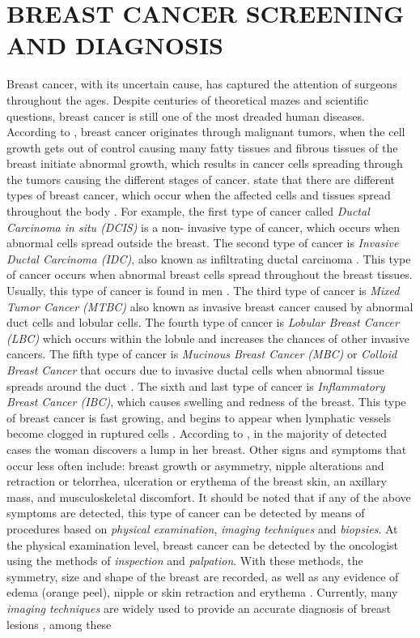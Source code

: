 \section{BREAST CANCER SCREENING AND DIAGNOSIS}
Breast cancer, with its uncertain cause, has captured the attention of surgeons throughout the ages. Despite centuries of theoretical mazes and scientific questions, breast cancer is still one of the most dreaded human diseases\cite{Bland2009}. According to \cite{Fatima2020}, breast cancer originates through malignant tumors, when the cell growth gets out of control causing many fatty tissues and fibrous tissues of the breast initiate abnormal growth, which results in cancer cells spreading through the tumors causing the different stages of cancer. \cite{Fatima2020} state that there are different types of breast cancer, which occur when the affected cells and tissues spread throughout the body \cite{Sun2017}. For example, the first type of cancer called \textit{Ductal Carcinoma in situ (DCIS)} is a non- invasive type of cancer\cite{Hou2020}, which occurs when abnormal cells spread outside the breast. The second type of cancer is \textit{Invasive Ductal Carcinoma (IDC)}, also known as infiltrating ductal carcinoma \cite{Chaudhury2011}. This type of cancer occurs when abnormal breast cells spread throughout the breast tissues. Usually, this type of cancer is found in men \cite{Page1982}. The third type of cancer is \textit{Mixed Tumor Cancer (MTBC)} also known as invasive breast cancer\cite{Tuck1997}  caused by abnormal duct cells and lobular cells\cite{Lee2017}. The fourth type of cancer is \textit{Lobular Breast Cancer (LBC)}\cite{Masciari2007}  which occurs within the lobule and increases the chances of other invasive cancers. The fifth type of cancer is \textit{Mucinous Breast Cancer (MBC)} or \textit{Colloid Breast Cancer}\cite{Memis2000} that occurs due to invasive ductal cells when abnormal tissue spreads around the duct \cite{Gradilone2011}. The sixth and last type of cancer is \textit{Inflammatory Breast Cancer (IBC)}, which causes swelling and redness of the breast. This type of breast cancer is fast growing, and begins to appear when lymphatic vessels become clogged in ruptured cells \cite{Robertson2010}. According to \cite{Brunicardi2010}, in the majority of detected cases the woman discovers a lump in her breast. Other signs and symptoms that occur less often include: breast growth or asymmetry, nipple alterations and retraction or telorrhea, ulceration or erythema of the breast skin, an axillary mass, and musculoskeletal discomfort. It should be noted that if any of the above symptoms are detected, this type of cancer can be detected by means of procedures based on \textit{physical examination}, \textit{imaging techniques} and \textit{biopsies}. At the physical examination level, breast cancer can be detected by the oncologist using the methods of \textit{inspection} and \textit{palpation}. With these methods, the symmetry, size and shape of the breast are recorded, as well as any evidence of edema (orange peel), nipple or skin retraction and erythema \cite{Brunicardi2010}. Currently, many \textit{imaging techniques} are widely used to provide an accurate diagnosis of breast lesions \cite{Tamam2021}, among these 